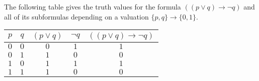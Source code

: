 

\setcounter{section}{1}
\setcounter{subsection}{2}
\setcounter{dfn}{2}

\begin{exl}
\label{exl:TruthTable}
The following table gives the truth values for the formula $((p \vee q) \to \neg q)$ and all of its subformulas
depending on a valuation $\{p, q\} \to \{0,1\}$.
\begin{center}
\begin{tabular}{|c|c|c|c|c|}
\hline
$p$ & $q$ & $(p \vee q)$ & $\neg q$ & $((p \vee q) \to \neg q)$\\\hline
$0$ & $0$ & $0$ & $1$ & $1$\\\hline
$0$ & $1$ & $1$ & $0$ & $0$\\\hline
$1$ & $0$ & $1$ & $1$ & $1$\\\hline
$1$ & $1$ & $1$ & $0$ & $0$\\\hline
\end{tabular}
\end{center}
\end{exl}


